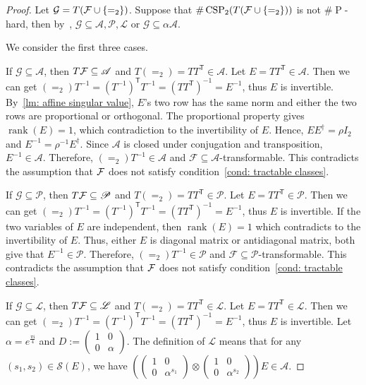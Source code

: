 \CSPwithEQ*
\begin{proof}
    Let $\mathcal{G}=T(\mathcal{F}\cup \{=_2\})$.
    Suppose that $\#\operatorname{CSP}_2(T(\mathcal{F}\cup \{=_2\}))$ is not $\#\operatorname{P}$-hard, then by~\cite{real_holantc}, $\mathcal{G}\subseteq \mathscr{A},\mathscr{P},\mathscr{L}$ or $\mathcal{G}\subseteq \alpha\mathscr{A}$.

    We consider the first three cases. 
    
    If $\mathcal{G}\subseteq \mathscr{A}$, then $T\mathcal{F}\subseteq \mathscr{A}$ and $T(=_2)=TT^{\mathsf T}\in \mathscr{A}$. Let $E=TT^{\mathsf T}\in \mathscr{A}$. Then we can get $(=_2)T^{-1}=(T^{-1})^{\mathsf T}T^{-1}=(TT^{\mathsf T})^{-1}=E^{-1}$, thus $E$ is invertible. By~\cref{lm: affine singular value}, $E$'s two row has the same norm and either the two rows are proportional or orthogonal. The proportional property gives $\operatorname{rank}(E)=1$, which contradiction to the invertibility of $E$. Hence, $EE^\dagger=\rho I_2$ and $E^{-1}=\rho^{-1}E^\dagger$. Since $\mathcal{A}$ is closed under conjugation and transposition, $E^{-1}\in \mathscr{A}$. Therefore, $(=_2)T^{-1}\in \mathscr{A}$ and $\mathcal{F}\subseteq \mathscr{A}$-transformable. This contradicts the assumption that $\mathcal{F}$ does not satisfy condition~\eqref{cond: tractable classes}.

    If $\mathcal{G}\subseteq \mathscr{P}$, then $T\mathcal{F}\subseteq \mathscr{P}$ and $T(=_2)=TT^{\mathsf T}\in \mathscr{P}$. Let $E=TT^{\mathsf T}\in \mathscr{P}$. Then we can get $(=_2)T^{-1}=(T^{-1})^{\mathsf T}T^{-1}=(TT^{\mathsf T})^{-1}=E^{-1}$, thus $E$ is invertible. If the two variables of $E$ are independent, then $\operatorname{rank}(E)=1$ which contradicts to the invertibility of $E$. Thus, either $E$ is diagonal matrix or antidiagonal matrix, both give that $E^{-1}\in \mathscr{P}$. Therefore, $(=_2)T^{-1}\in \mathscr{P}$ and $\mathcal{F}\subseteq \mathscr{P}$-transformable. This contradicts the assumption that $\mathcal{F}$ does not satisfy condition~\eqref{cond: tractable classes}.

    If $\mathcal{G}\subseteq \mathscr{L}$, then $T\mathcal{F}\subseteq \mathscr{L}$ and $T(=_2)=TT^{\mathsf T}\in \mathscr{L}$. Let $E=TT^{\mathsf T}\in \mathscr{L}$. Then we can get $(=_2)T^{-1}=(T^{-1})^{\mathsf T}T^{-1}=(TT^{\mathsf T})^{-1}=E^{-1}$, thus $E$ is invertible. Let $\alpha=e^{\frac{\pi \mathfrak i}{4}}$ and $D:=\left( \begin{matrix}
        1 & 0\\
        0 & \alpha 
    \end{matrix}\right).$ The definition of $\mathscr{L}$ means that for any $(s_1,s_2)\in \mathscr{S}(E)$, we have $\left(\left( \begin{matrix}
        1 & 0\\
        0 & \alpha^{s_1}
    \end{matrix}\right)\otimes \left( \begin{matrix}
        1 & 0\\
        0 & \alpha^{s_2}
    \end{matrix}\right)\right)E\in \mathscr{A}$.


\end{proof}
